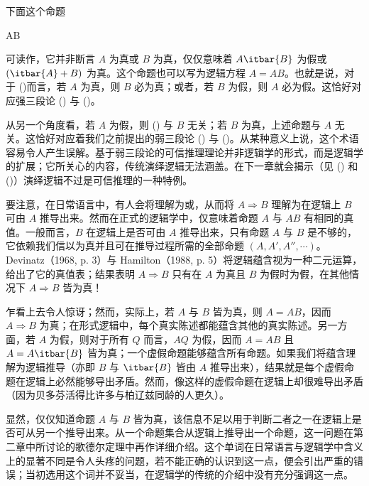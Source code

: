 \blank[big]
\blank[small]

下面这个命题

\placeformula[implication]
\startformula
A\Rightarrow B
\stopformula

可读作，它并非断言 $A$ 为真或 $B$ 为真，仅仅意味着 $A\itbar{B}$ 为假或 $(\itbar{A} + B)$ 为真。这个命题也可以写为逻辑方程 $A = AB$。也就是说，对于 (\in[implication])而言，若 $A$ 为真，则 $B$ 必为真；或者，若 $B$ 为假，则 $A$ 必为假。这恰好对应强三段论 (\in[syllogism-1]) 与 (\in[syllogism-2])。

从另一个角度看，若 $A$ 为假，则 (\in[implication]) 与 $B$ 无关；若 $B$ 为真，上述命题与 $A$ 无关。这恰好对应着我们之前提出的弱三段论 (\in[weak-1]) 与 (\in[weak-2])。从某种意义上说，这个术语容易令人产生误解。基于弱三段论的可信推理理论并非逻辑学的形式，而是逻辑学的扩展；它所关心的内容，传统演绎逻辑无法涵盖。在下一章就会揭示（见 (\in[2-69]) 和 (\in[2-70])）演绎逻辑不过是可信推理的一种特例。

\blank[big]
\blank[small]

要注意，在日常语言中，有人会将理解为或，从而将 $A\Rightarrow B$ 理解为在逻辑上 $B$ 可由 $A$ 推导出来。然而在正式的逻辑学中，仅意味着命题 $A$ 与 $AB$ 有相同的真值。一般而言，$B$ 在逻辑上是否可由 $A$ 推导出来，只有命题 $A$ 与 $B$ 是不够的，它依赖我们信以为真并且可在推导过程所需的全部命题 $(A, A', A'',\cdots)$。Devinatz（1968, p. 3）与 Hamilton（1988, p. 5）将逻辑蕴含视为一种二元运算，给出了它的真值表；结果表明 $A\Rightarrow B$ 只有在 $A$ 为真且 $B$ 为假时为假，在其他情况下 $A\Rightarrow B$  皆为真！

乍看上去令人惊讶；然而，实际上，若 $A$ 与 $B$ 皆为真，则 $A = AB$，因而 $A\Rightarrow B$ 为真；在形式逻辑中，每个真实陈述都能蕴含其他的真实陈述。另一方面，若 $A$ 为假，则对于所有 $Q$ 而言，$AQ$ 为假，因而 $A = AB$ 且 $A = A\itbar{B}$ 皆为真；一个虚假命题能够蕴含所有命题。如果我们将蕴含理解为逻辑推导（亦即 $B$ 与 $\itbar{B}$ 皆由 $A$ 推导出来），结果就是每个虚假命题在逻辑上必然能够导出矛盾。然而，像这样的虚假命题在逻辑上却很难导出矛盾（因为贝多芬活得比许多与柏辽兹同龄的人更久）。

显然，仅仅知道命题 $A$ 与 $B$ 皆为真，该信息不足以用于判断二者之一在逻辑上是否可从另一个推导出来。从一个命题集合从逻辑上推导出一个命题，这一问题在第二章中所讨论的歌德尔定理中再作详细介绍。这个单词在日常语言与逻辑学中含义上的显著不同是令人头疼的问题，若不能正确的认识到这一点，便会引出严重的错误；当初选用这个词并不妥当，在逻辑学的传统的介绍中没有充分强调这一点。

